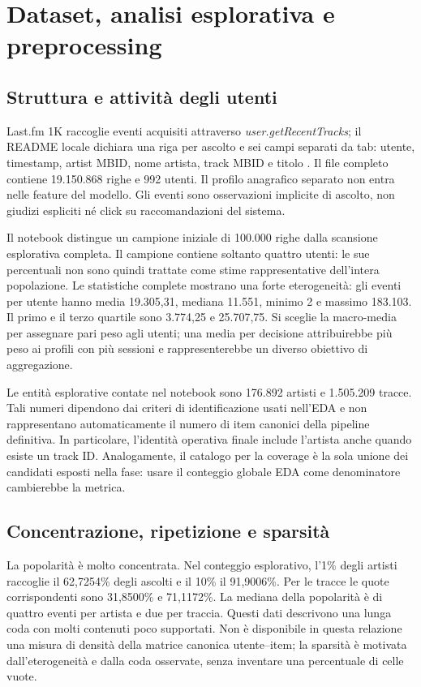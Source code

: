 \chapter{Dataset, analisi esplorativa e preprocessing}\label{ch:dati}
\section{Struttura e attività degli utenti}
Last.fm 1K raccoglie eventi acquisiti attraverso \emph{user.getRecentTracks}; il README locale dichiara una riga per ascolto e sei campi separati da tab: utente, timestamp, artist MBID, nome artista, track MBID e titolo \cite{lastfm}. Il file completo contiene 19.150.868 righe e 992 utenti. Il profilo anagrafico separato non entra nelle feature del modello. Gli eventi sono osservazioni implicite di ascolto, non giudizi espliciti né click su raccomandazioni del sistema.

Il notebook  distingue un campione iniziale di 100.000 righe dalla scansione esplorativa completa. Il campione contiene soltanto quattro utenti: le sue percentuali non sono quindi trattate come stime rappresentative dell'intera popolazione. Le statistiche complete mostrano una forte eterogeneità: gli eventi per utente hanno media 19.305,31, mediana 11.551, minimo 2 e massimo 183.103. Il primo e il terzo quartile sono 3.774,25 e 25.707,75. Si sceglie la macro-media per assegnare pari peso agli utenti; una media per decisione attribuirebbe più peso ai profili con più sessioni e rappresenterebbe un diverso obiettivo di aggregazione.


Le entità esplorative contate nel notebook sono 176.892 artisti e 1.505.209 tracce. Tali numeri dipendono dai criteri di identificazione usati nell'EDA e non rappresentano automaticamente il numero di item canonici della pipeline definitiva. In particolare, l'identità operativa finale include l'artista anche quando esiste un track ID. Analogamente, il catalogo per la coverage è la sola unione dei candidati esposti nella fase: usare il conteggio globale EDA come denominatore cambierebbe la metrica.

\clearpage
\section{Concentrazione, ripetizione e sparsità}
La popolarità è molto concentrata. Nel conteggio esplorativo, l'1\% degli artisti raccoglie il 62,7254\% degli ascolti e il 10\% il 91,9006\%. Per le tracce le quote corrispondenti sono 31,8500\% e 71,1172\%. La mediana della popolarità è di quattro eventi per artista e due per traccia. Questi dati descrivono una lunga coda con molti contenuti poco supportati. Non è disponibile in questa relazione una misura di densità della matrice canonica utente--item; la sparsità è motivata dall'eterogeneità e dalla coda osservate, senza inventare una percentuale di celle vuote.

